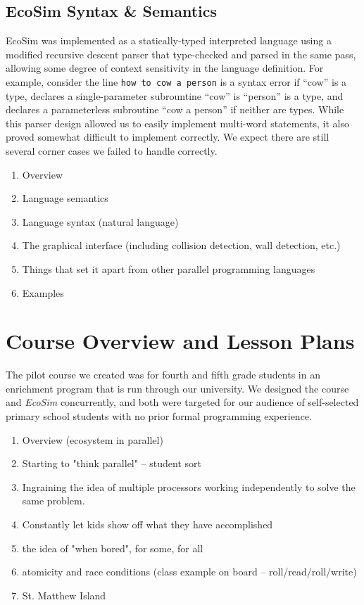 \documentclass{sig-alternate}
\begin{document}
\subsection{EcoSim Syntax \& Semantics}
EcoSim was implemented as a statically-typed interpreted language
using a modified recursive descent parser that type-checked and parsed in the same pass,
allowing some degree of context sensitivity in the language definition.
For example, consider the line \texttt{how to cow a person}
is a syntax error if ``cow'' is a type,
declares a single-parameter subrountine ``cow'' is ``person'' is a type,
and declares a parameterless subroutine ``cow a person'' if neither are types.
While this parser design allowed us to easily implement multi-word statements,
it also proved somewhat difficult to implement correctly.
We expect there are still several corner cases we failed to handle correctly.



\begin{enumerate}
\item Overview
\item Language semantics
\item Language syntax (natural language)
\item The graphical interface (including collision detection, wall detection, etc.)
\item Things that set it apart from other parallel programming languages
\item Examples
\end{enumerate}

\section{Course Overview and Lesson Plans}
The pilot course we created was for fourth and fifth grade students in an enrichment program
that is run through our university.  We designed the course and \emph{EcoSim} concurrently,
and both were targeted for our audience of self-selected primary school students with no
prior formal programming experience.
\begin{enumerate}
\item Overview (ecosystem in parallel)
\item Starting to "think parallel" -- student sort
\item Ingraining the idea of multiple processors working independently to solve the same problem.
\item Constantly let kids show off what they have accomplished
\item the idea of "when bored", for some, for all
\item atomicity and race conditions (class example on board -- roll/read/roll/write)
\item St. Matthew Island
\end{enumerate}
\end{document}
